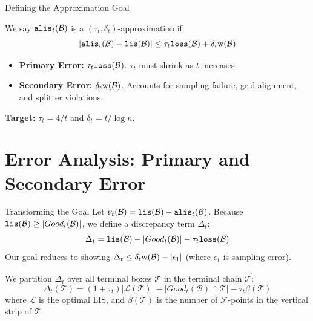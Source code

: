 \documentclass[11pt,aspectratio=169]{beamer}
\newcommand{\lis}{{\tt lis}}
\newcommand{\loss}{{\tt loss}}
\newcommand{\alis}{{\tt alis}}
\newcommand{\width}{{\bf {\rm  w}}}
\begin{document}
\begin{frame}{Defining the Approximation Goal}
    \begin{definition}
        We say $\alis_t(\mathcal{B})$ is a $(\tau_t, \delta_t)$-approximation if:
        $$|\alis_t(\mathcal{B}) - \lis(\mathcal{B})| \leq \tau_t \loss(\mathcal{B}) + \delta_t \width(\mathcal{B})$$
    \end{definition}
    
    \begin{itemize}
        \item \textbf{Primary Error:} $\tau_t \loss(\mathcal{B})$. $\tau_t$ must shrink as $t$ increases.
        \item \textbf{Secondary Error:} $\delta_t \width(\mathcal{B})$. Accounts for sampling failure, grid alignment, and splitter violations.
    \end{itemize}
    \textbf{Target:} $\tau_t = 4/t$ and $\delta_t = t/\log n$.
\end{frame}

\section{Error Analysis: Primary and Secondary Error}

\begin{frame}{Transforming the Goal}
    Let $\nu_t(\mathcal{B}) = \lis(\mathcal{B}) - \alis_t(\mathcal{B})$. Because $\lis(\mathcal{B}) \geq |Good_t(\mathcal{B})|$, we define a discrepancy term $\Delta_t$:
    $$\Delta_t = \lis(\mathcal{B}) - |Good_t(\mathcal{B})| - \tau_t \loss(\mathcal{B})$$
    Our goal reduces to showing $\Delta_t \leq \delta_t \width(\mathcal{B}) - |\epsilon_1|$ (where $\epsilon_1$ is sampling error).
    
    We partition $\Delta_t$ over all terminal boxes $\mathcal{T}$ in the terminal chain $\vec{\mathcal{T}}$:
    $$\Delta_t(\mathcal{T}) = (1+\tau_t)|\mathcal{L}(\mathcal{T})| - |Good_t(\mathcal{B}) \cap \mathcal{T}| - \tau_t \beta(\mathcal{T})$$
    where $\mathcal{L}$ is the optimal LIS, and $\beta(\mathcal{T})$ is the number of $\mathcal{F}$-points in the vertical strip of $\mathcal{T}$.
\end{frame}
\end{document}
